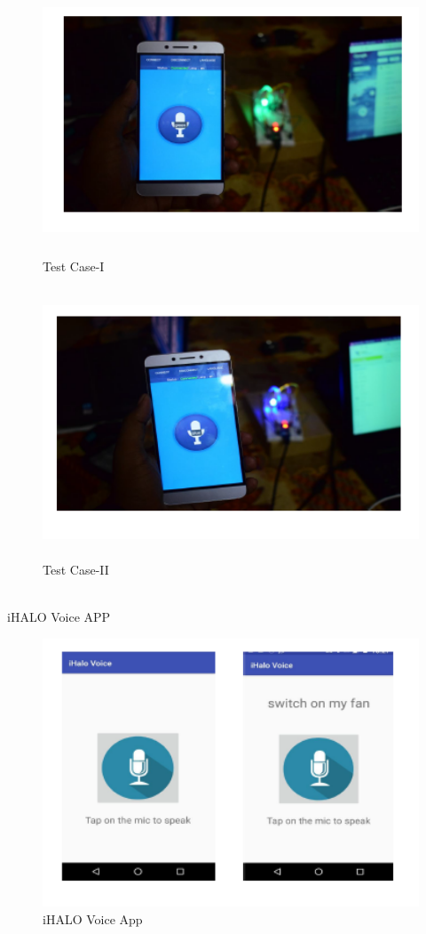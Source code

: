 \begin{figure}[H]
	
	\centering
	\includegraphics[width=\linewidth,height=8cm] {./images/p18.png}
	\caption{Test Case-I}
	\label{manual}
\end{figure}

\begin{figure}[H]
	
	\centering
	\includegraphics[width=\linewidth,height=8cm] {./images/p19.png}
	\caption{Test Case-II}
	\label{manual}
\end{figure}\\

iHALO Voice APP
\begin{figure}[H]
	
	\centering
	\includegraphics[width=\linewidth,height=8cm] {./images/p20.png}
	\caption{iHALO Voice App}
	\label{manual}
\end{figure}\\

